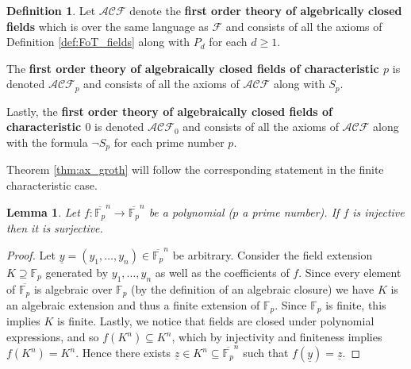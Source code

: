 \documentclass[12pt]{article}
\theoremstyle{plain}
\newtheorem{lemma}[thm]{Lemma}
\theoremstyle{definition}
\newtheorem{defn}[thm]{Definition} %
\newcommand{\bb}[1]{\mathbb{#1}}
\newcommand{\call}[1]{\mathcal{#1}}
\newcommand{\lto}{\longrightarrow}
\begin{document}
	\begin{defn}
		Let $\call{ACF}$ denote the \textbf{first order theory of algebrically closed fields} which is over the same language as $\call{F}$ and consists of all the axioms of Definition \ref{def:FoT_fields} along with $P_d$ for each $d \geq 1$.
		
		The \textbf{first order theory of algebraically closed fields of characteristic $p$} is denoted $\call{ACF}_p$ and consists of all the axioms of $\call{ACF}$ along with $S_p$.
		
		Lastly, the \textbf{first order theory of algebraically closed fields of characteristic $0$} is denoted $\call{ACF}_0$ and consists of all the axioms of $\call{ACF}$ along with the formula $\neg S_p$ for each prime number $p$.
		\end{defn}
	
	Theorem \ref{thm:ax_groth} will follow the corresponding statement in the finite characteristic case.
	
	\begin{lemma}\label{lem:finite_characteristic_ax}
		Let $f: \overline{\bb{F}_p}^n \lto \overline{\bb{F}_p}^n$ be a polynomial ($p$ a prime number). If $f$ is injective then it is surjective.
		\end{lemma}
	\begin{proof}
		Let $\underline{y} = (y_1,\ldots, y_n) \in \overline{\bb{F}_p}^n$ be arbitrary. Consider the field extension $K \supseteq \bb{F}_p$ generated by $y_1,\ldots, y_n$ as well as the coefficients of $f$. Since every element of $\overline{\bb{F}_p}$ is algebraic over $\bb{F}_p$ (by the definition of an algebraic closure) we have $K$ is an algebraic extension and thus a finite extension of $\bb{F}_p$. Since $\bb{F}_p$ is finite, this implies $K$ is finite. Lastly, we notice that fields are closed under polynomial expressions, and so $f(K^n) \subseteq K^n$, which by injectivity and finiteness implies $f(K^n) = K^n$. Hence there exists $\underline{z} \in K^n \subseteq \overline{\bb{F}_p}^n$ such that $f(\underline{y}) = \underline{z}$.
		\end{proof}
	
\end{document}
